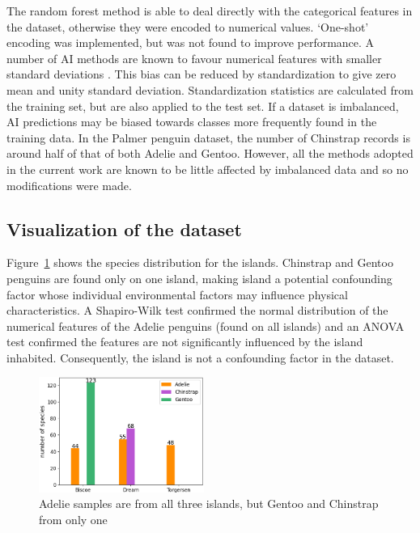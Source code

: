 \documentclass[12pt]{article}
\begin{document}
The random forest method is able to deal directly with the categorical features in the dataset, 
otherwise they were encoded to numerical values. `One-shot' encoding was implemented, but was not found to 
improve performance. A number of AI methods are known to favour numerical features 
with smaller standard deviations \cite{hastie2009elements}. 
This bias can be reduced by standardization to give zero mean and unity standard deviation. 
Standardization statistics are calculated from the training set, but are also applied to the test set. 
If a dataset is imbalanced, 
AI predictions may be biased towards classes more frequently found in the training data. 
In the Palmer penguin dataset, the number of Chinstrap records is around half of that of both Adelie and Gentoo.
However, all the methods adopted in the current work are known to be little affected by 
imbalanced data \cite{he2009learning} and so no modifications were made.

\subsection*{Visualization of the dataset}

Figure~\ref{fig:islands} shows the species distribution for the islands. 
Chinstrap and Gentoo penguins are found only on one island, making island a potential confounding factor whose 
individual environmental factors may influence physical characteristics. 
A Shapiro-Wilk test confirmed the normal distribution of the numerical features of the Adelie penguins (found on 
all islands) and an ANOVA test confirmed the features are not significantly influenced by the island inhabited. 
Consequently, the island is not a confounding factor in the dataset.

\begin{figure} %
  \centering
  \vspace{-1.5\baselineskip} %
  \includegraphics[width=0.48\textwidth]{islands.png} %
  \vspace{-0.5\baselineskip} %
  \caption{Adelie samples are from all three islands, but Gentoo and Chinstrap from only one}
  \vspace{-1.5\baselineskip} %
  \label{fig:islands}
\end{figure}
\end{document}
